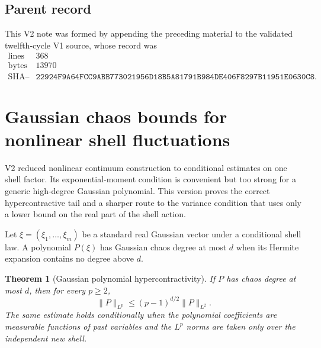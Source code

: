 \documentclass[11pt]{article}
\newtheorem{theorem}{Theorem}[section]
\theoremstyle{remark}
\begin{document}
\subsection{Parent record}

This V2 note was formed by appending the preceding material to the
validated twelfth-cycle V1 source, whose record was
\[
\begin{array}{c|c}
\text{lines}&368\\
\text{bytes}&13970\\
\text{SHA--256}&
\texttt{22924F9A64FCC9ABB773021956D18B5A81791B984DE406F8297B11951E0630C8}.
\end{array}                                                     \tag{2.26}
\]


\section{Gaussian chaos bounds for nonlinear shell fluctuations}
\label{sec:v12v3}

V2 reduced nonlinear continuum construction to conditional estimates
on one shell factor.  Its exponential-moment condition is convenient
but too strong for a generic high-degree Gaussian polynomial.
This version proves the correct hypercontractive tail and a sharper
route to the variance condition that uses only a lower bound on the
real part of the shell action.

Let \(\xi=(\xi_1,\ldots,\xi_m)\) be a standard real Gaussian vector
under a conditional shell law.  A polynomial \(P(\xi)\) has Gaussian
chaos degree at most \(d\) when its Hermite expansion contains no
degree above \(d\).

\begin{theorem}[Gaussian polynomial hypercontractivity]
\label{thm:v12v3-hyper}
If \(P\) has chaos degree at most \(d\), then for every \(p\ge2\),
\[
                 \|P\|_{L^p}
                 \le(p-1)^{d/2}\|P\|_{L^2}.                 \tag{3.1}
\]
The same estimate holds conditionally when the polynomial
coefficients are measurable functions of past variables and the
\(L^p\) norms are taken only over the independent new shell.
\end{theorem}
\end{document}
